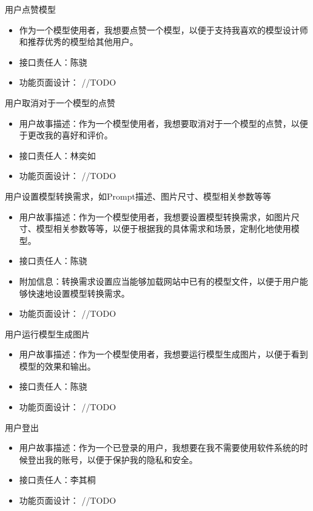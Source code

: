\begin{frame}{用户点赞模型}
    \begin{itemize}
        \item 作为一个模型使用者，我想要点赞一个模型，以便于支持我喜欢的模型设计师和推荐优秀的模型给其他用户。
        \item 接口责任人：陈骁
        \item 功能页面设计： //TODO
    \end{itemize}
\end{frame}

\begin{frame}{用户取消对于一个模型的点赞}
    \begin{itemize}
        \item 用户故事描述：作为一个模型使用者，我想要取消对于一个模型的点赞，以便于更改我的喜好和评价。
        \item 接口责任人：林奕如
        \item 功能页面设计： //TODO
    \end{itemize}
\end{frame}

\begin{frame}{用户设置模型转换需求，如Prompt描述、图片尺寸、模型相关参数等等}
    \begin{itemize}
        \item 用户故事描述：作为一个模型使用者，我想要设置模型转换需求，如图片尺寸、模型相关参数等等，以便于根据我的具体需求和场景，定制化地使用模型。
        \item 接口责任人：陈骁
        \item 附加信息：转换需求设置应当能够加载网站中已有的模型文件，以便于用户能够快速地设置模型转换需求。
        \item 功能页面设计： //TODO
    \end{itemize}
\end{frame}

\begin{frame}{用户运行模型生成图片}
    \begin{itemize}
        \item 用户故事描述：作为一个模型使用者，我想要运行模型生成图片，以便于看到模型的效果和输出。
        \item 接口责任人：陈骁
        \item 功能页面设计： //TODO
    \end{itemize}
\end{frame}

\begin{frame}{用户登出}
    \begin{itemize}
        \item 用户故事描述：作为一个已登录的用户，我想要在我不需要使用软件系统的时候登出我的账号，以便于保护我的隐私和安全。
        \item 接口责任人：李其桐
        \item 功能页面设计： //TODO
    \end{itemize}
\end{frame}

